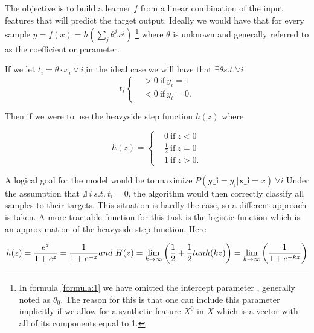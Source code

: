 The objective is to build a learner $f$ from a linear combination of the input features that will predict the target output. Ideally we would have that for every sample $y = f(x) = h\left(\sum_{j}\theta^jx^j\right)$ \label{formula:1} \footnote{In formula \ref{formula:1} we have omitted the intercept parameter , generally noted as $\theta_0$. The reason for this is that one can include this parameter implicitly if we allow for a synthetic feature $X^0$ in $X$ which is a vector with all of its components equal to 1.  } where $\theta$ is unknown and generally referred to as the coefficient or parameter. 

If we let $ t_i = \theta \cdot x_i  \ \forall \ i $,in the ideal case we will have that $\exists \theta s.t. \forall i $ 
\[
    t_i
      \begin{cases}
        &>0 \ \mbox{if} \ y_i=1 \\
        &<0 \ \mbox{if} \ y_i=0.
      \end{cases}
    \]

Then if we were to use the heavyside step function $h(z)$  where

\[
    h(z) =
      \begin{cases}
        &0 \ \mbox{if} \ z<0 \\
        &\frac{1}{2} \ \mbox{if} \  z=0 \\
        &1 \ \mbox{if} \  z>0.
      \end{cases}
    \]

A logical goal for the model would be to maximize $P(\textbf{y_i} = y_i | \textbf{x_i} = x) \ \forall i$
Under the assumption that $\nexists\  i \  s.t. \ t_i = 0$, the algorithm would then correctly classify all samples to their targets. This situation is hardly the case, so a different approach is taken. A more tractable function for this task is the logistic function which is an approximation of the heavyside step function. Here  

\begin{equation} \label{eq:logit}
h(z)  = \frac{e^{z}}{1 + e^{z}} = \frac{1}{1 + e^{-z}}  \\
and \  H(z) = \lim_{k \to \infty} \left(\frac{1}{2} + \frac{1}{2}tanh(kz) \right) = \lim_{k \to \infty} \left(\frac{1}{1+e^{-kz}} \right)  
\end{equation}


